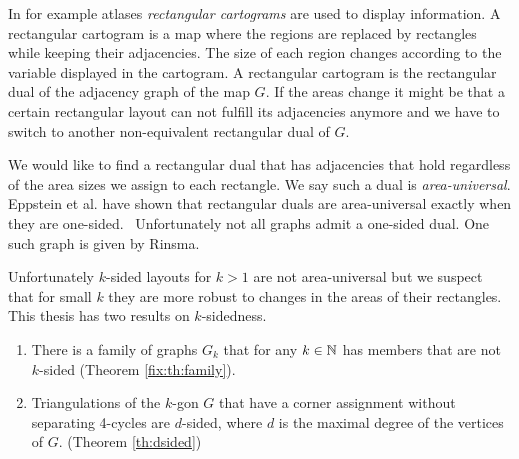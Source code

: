   In for example atlases \emph{rectangular cartograms} are used to display information. A rectangular cartogram is a map where the regions are replaced by rectangles while keeping their adjacencies. The size of each region changes according to the variable displayed in the cartogram.  A rectangular cartogram is the rectangular dual of the adjacency graph of the map $G$.
  If the areas change it might be that a certain rectangular layout can not fulfill its adjacencies anymore and we have to switch to another non-equivalent rectangular dual of $G$.

  We would like to find a rectangular dual that has adjacencies that hold regardless of the area sizes we assign to each rectangle. We say such a dual is \emph{area-universal}.
  Eppstein et al. have shown that rectangular duals are area-universal exactly when they are one-sided.~\cite{Eppstein2012} Unfortunately not all graphs admit a one-sided dual. One such graph is given by Rinsma.~\cite{Rinsma1987} 

  Unfortunately $k$-sided layouts for $k>1$ are not area-universal but we suspect that for small $k$ they are more robust to changes in the areas of their rectangles. This thesis has two results on $k$-sidedness.
  \begin{enumerate}
    \item There is a family of graphs $G_k$ that for any $k \in \mathbb{N}$ has members that are not $k$-sided (Theorem \ref{fix:th:family}).
    \item Triangulations of the $k$-gon $G$ that have a corner assignment without separating 4-cycles are $d$-sided, where $d$ is the maximal degree of the vertices of $G$. (Theorem \ref{th:dsided})
  \end{enumerate}

